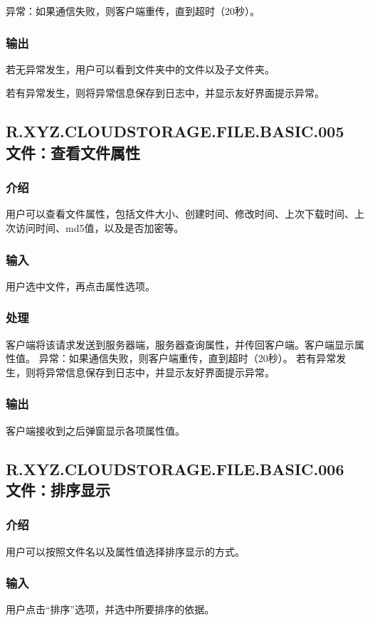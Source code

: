 异常：如果通信失败，则客户端重传，直到超时（20秒）。

\subsubsection{输出}
若无异常发生，用户可以看到文件夹中的文件以及子文件夹。

若有异常发生，则将异常信息保存到日志中，并显示友好界面提示异常。

\subsection{R.XYZ.CLOUDSTORAGE.FILE.BASIC.005 文件：查看文件属性}

\subsubsection{介绍} 
用户可以查看文件属性，包括文件大小、创建时间、修改时间、上次下载时间、上次访问时间、md5值，以及是否加密等。

\subsubsection{输入} 
用户选中文件，再点击属性选项。

\subsubsection{处理}
客户端将该请求发送到服务器端，服务器查询属性，并传回客户端。客户端显示属性值。
异常：如果通信失败，则客户端重传，直到超时（20秒）。
若有异常发生，则将异常信息保存到日志中，并显示友好界面提示异常。

\subsubsection{输出}
客户端接收到之后弹窗显示各项属性值。


\subsection{R.XYZ.CLOUDSTORAGE.FILE.BASIC.006 文件：排序显示}

\subsubsection{介绍} 
用户可以按照文件名以及属性值选择排序显示的方式。

\subsubsection{输入} 
用户点击“排序”选项，并选中所要排序的依据。

